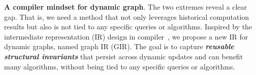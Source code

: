 







\textbf{A compiler mindset for dynamic graph}.
The two extremes reveal a clear gap.
That is, we need a method that not only leverages historical computation results but also is not tied to any specific queries or algorithms.
Inspired by the intermediate representation (IR) design in compiler~\cite{Lattner2004LLVM}, we propose a new  IR for dynamic graphs, named graph IR (GIR).
The goal is to capture \textbf{\textit{reusable structural invariants}} that persist across dynamic updates and can benefit many algorithms, without being tied to any specific queries or algorithms.

